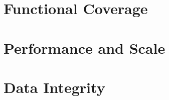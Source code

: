 
\section{Functional Coverage}
\label{sec:eval:coverage}

\section{Performance and Scale}
\label{sec:eval:performance}

\section{Data Integrity}
\label{sec:eval:integrity}
